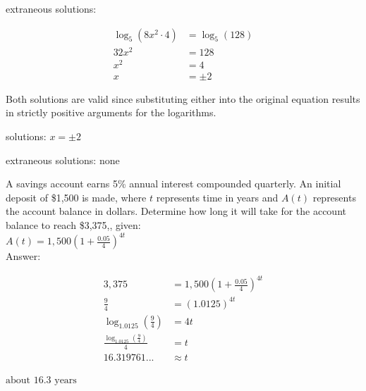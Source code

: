 \documentclass[11pt]{exam}
\begin{document}
\begin{questions}
         extraneous solutions: \fillin[][2in]\\
\begin{solution}
\[\begin{aligned} \log_{5}(8x^2 \cdot 4) &= \log_{5}(128) \\ 32x^2 &= 128 \\ x^2 &= 4 \\ x &= \pm 2 \end{aligned}\]

 Both solutions are valid since substituting either into the original equation results in strictly positive arguments for the logarithms. 

solutions: \(\boxed{ x = \pm 2 }\)

extraneous solutions: \(\boxed{ \text{none} }\)
\end{solution}

\newpage

\question[6] 
A savings account earns 5\% annual interest compounded quarterly. An initial deposit of \$1,500 is made, where $t$ represents time in years and $A(t)$ represents the account balance in dollars. Determine how long it will take for the account balance to reach \$3,375,, given:\\

 \(\displaystyle{ \displaystyle{A(t) = 1,500 \left( 1 + \frac{0.05}{4} \right)^{4t}} }\) \\

 Answer: \fillin[][2in]
\begin{solution}
\[\begin{aligned} 3,375 &= 1,500 \left( 1 + \frac{0.05}{4} \right)^{4t} \\ \frac{9}{4} &= (1.0125)^{4t} \\ \log_{1.0125}\left(\frac{9}{4}\right) &= 4t \\ \frac{\log_{1.0125}\left(\frac{9}{4}\right)}{4} &= t \\ 16.319761... &\approx t \end{aligned}\]

\(\boxed{\text{about } 16.3 \text{ years}}\)
\end{solution}

\label{exact-endocg}

\newpage

\headerbox{\och}
\label{exact-startoch}


\end{questions}
\end{document}
